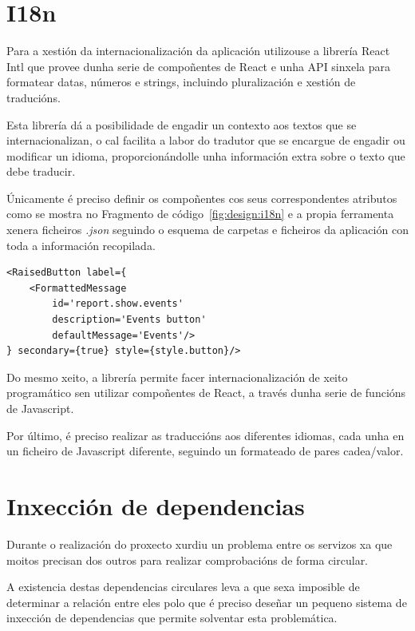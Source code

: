   \section{I18n}
  Para a xestión da internacionalización da aplicación utilizouse a librería 
React Intl que provee dunha serie de compoñentes de React e unha API sinxela 
para formatear datas, números e strings, incluindo pluralización e xestión de 
traducións.

  Esta librería dá a posibilidade de engadir un contexto aos textos que se 
internacionalizan, o cal facilita a labor do tradutor que se encargue de 
engadir ou modificar un idioma, proporcionándolle unha información extra sobre 
o texto que debe traducir.

  Únicamente é preciso definir os compoñentes cos seus correspondentes 
atributos como se mostra no Fragmento de código~\ref{fig:design:i18n} e a 
propia ferramenta xenera 
ficheiros \emph{.json} seguindo o esquema de carpetas e ficheiros da aplicación 
con toda a información recopilada.

    \lstset{}
     \begin{lstlisting}[caption=Exemplo de internacionalización 
na label dun botón., label=fig:design:i18n]
<RaisedButton label={
    <FormattedMessage
        id='report.show.events'
        description='Events button'
        defaultMessage='Events'/>
} secondary={true} style={style.button}/>
    \end{lstlisting}

  Do mesmo xeito, a librería permite facer internacionalización de xeito 
programático sen utilizar compoñentes de React, a través dunha serie de 
funcións de Javascript.

  Por último, é preciso realizar as traduccións aos diferentes idiomas, cada 
unha en un ficheiro de Javascript diferente, seguindo un formateado de 
pares cadea/valor.

  \section{Inxección de dependencias}
  Durante o realización do proxecto xurdiu un problema entre os servizos xa 
que moitos precisan dos outros para realizar comprobacións de forma circular.

  A existencia destas dependencias circulares leva a que sexa imposible de
determinar a relación entre eles polo que é preciso deseñar un pequeno sistema 
de inxección de dependencias que permite solventar esta problemática.

